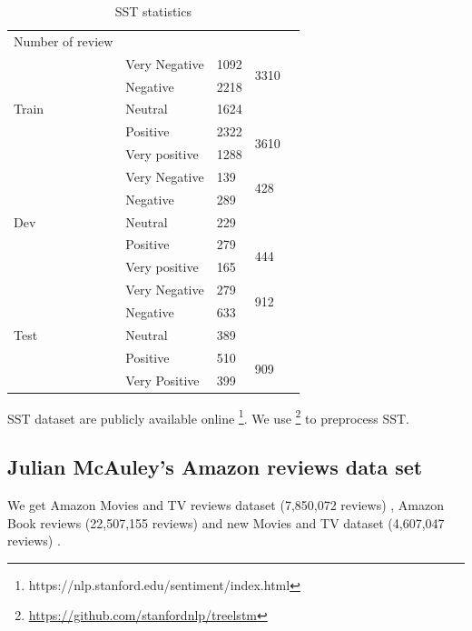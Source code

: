 \begin{table}[H]
	\centering
	\caption{SST statistics}
	\label{table:sststatistic}
	\begin{tabular}{lllll}
		Number of review       &               &      &                       &  \\ \cline{1-4}
		\multirow{5}{*}{Train} & Very Negative & 1092 & \multirow{2}{*}{3310} &  \\ \cline{2-3}
		& Negative      & 2218 &                       &  \\ \cline{2-4}
		& Neutral       & 1624 &                       &  \\ \cline{2-4}
		& Positive      & 2322 & \multirow{2}{*}{3610} &  \\ \cline{2-3}
		& Very positive & 1288 &                       &  \\ \cline{1-4}
		\multirow{5}{*}{Dev}   & Very Negative & 139  & \multirow{2}{*}{428}  &  \\ \cline{2-3}
		& Negative      & 289  &                       &  \\ \cline{2-4}
		& Neutral       & 229  &                       &  \\ \cline{2-4}
		& Positive      & 279  & \multirow{2}{*}{444}  &  \\ \cline{2-3}
		& Very positive & 165  &                       &  \\ \cline{1-4}
		\multirow{5}{*}{Test}  & Very Negative & 279  & \multirow{2}{*}{912}  &  \\ \cline{2-3}
		& Negative      & 633  &                       &  \\ \cline{2-4}
		& Neutral       & 389  &                       &  \\ \cline{2-4}
		& Positive      & 510  & \multirow{2}{*}{909}  &  \\ \cline{2-3}
		& Very Positive & 399  &                       &  \\ \cline{2-4}
	\end{tabular}
\end{table}


SST dataset are publicly available online \footnote{https://nlp.stanford.edu/sentiment/index.html}. We use
\footnote{\url{https://github.com/stanfordnlp/treelstm}} to preprocess SST.

\subsection{Julian McAuley's Amazon reviews data set}
We get Amazon Movies and TV reviews dataset (7,850,072 reviews) \cite{mcauley2013hidden}, Amazon Book reviews (22,507,155 reviews) and new Movies and TV dataset (4,607,047 reviews) \cite{he2016ups}. 

